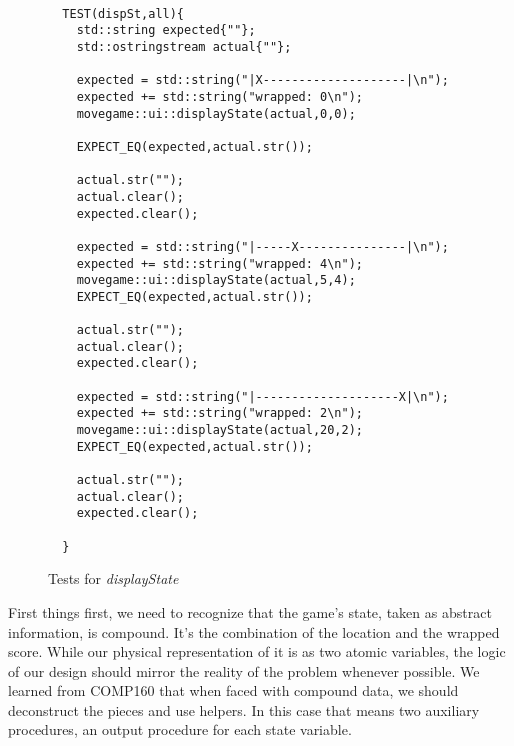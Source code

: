 \documentclass[nobib]{tufte-handout}
\begin{document}
\begin{figure}[!htbp]
\begin{lstlisting}

  TEST(dispSt,all){
    std::string expected{""};
    std::ostringstream actual{""};

    expected = std::string("|X--------------------|\n");
    expected += std::string("wrapped: 0\n");
    movegame::ui::displayState(actual,0,0);

    EXPECT_EQ(expected,actual.str());

    actual.str("");
    actual.clear();
    expected.clear();

    expected = std::string("|-----X---------------|\n");
    expected += std::string("wrapped: 4\n");
    movegame::ui::displayState(actual,5,4);
    EXPECT_EQ(expected,actual.str());

    actual.str("");
    actual.clear();
    expected.clear();   

    expected = std::string("|--------------------X|\n");
    expected += std::string("wrapped: 2\n");
    movegame::ui::displayState(actual,20,2);
    EXPECT_EQ(expected,actual.str());

    actual.str("");
    actual.clear();
    expected.clear();   

  }

\end{lstlisting}
\caption{Tests for \textit{displayState}}
\label{fig:display-tests}
\end{figure}

First things first, we need to recognize that the game's state, taken as abstract information, is compound. It's the combination of the location and the wrapped score. While our physical representation of it is as two atomic variables, the logic of our design should mirror the reality of the problem whenever possible. We learned from COMP160 that when faced with compound data, we should deconstruct the pieces and use helpers. In this case that means two auxiliary procedures, an output procedure for each state variable.
\end{document}
